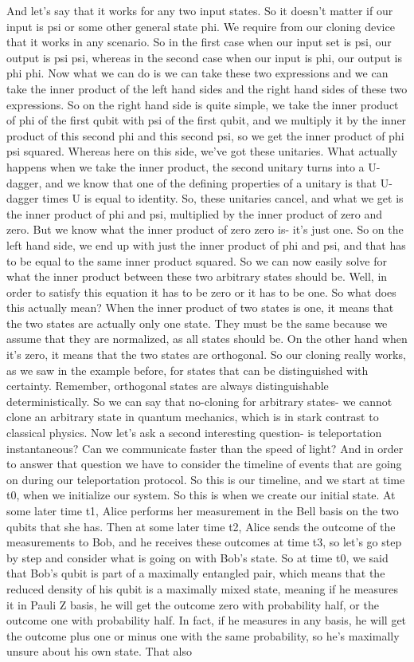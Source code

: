 And let's say that it works for any two input states. So it doesn't matter if our input is psi or some other general state phi. We require from our cloning device that it works in any scenario. So in the first case when our input set is psi, our output is psi psi, whereas in the second case when our input is phi, our output is phi phi. Now what we can do is we can take these two expressions and we can take the inner product of the left hand sides and the right hand sides of these two expressions. So on the right hand side is quite simple, we take the inner product of phi of the first qubit with psi of the first qubit, and we multiply it by the inner product of this second phi and this second psi, so we get the inner product of phi psi squared. Whereas here on this side, we've got these unitaries. What actually happens when we take the inner product, the second unitary turns into a U-dagger, and we know that one of the defining properties of a unitary is that U-dagger times U is equal to identity. So, these unitaries cancel, and what we get is the inner product of phi and psi, multiplied by the inner product of zero and zero. But we know what the inner product of zero zero is- it's just one. So on the left hand side, we end up with just the inner product of phi and psi, and that has to be equal to the same inner product squared. So we can now easily solve for what the inner product between these two arbitrary states should be. Well, in order to satisfy this equation it has to be zero or it has to be one. So what does this actually mean? When the inner product of two states is one, it means that the two states are actually only one state. They must be the same because we assume that they are normalized, as all states should be. On the other hand when it's zero, it means that the two states are orthogonal. So our cloning really works, as we saw in the example before, for states that can be distinguished with certainty. Remember, orthogonal states are always distinguishable deterministically. So we can say that no-cloning for arbitrary states- we cannot clone an arbitrary state in quantum mechanics, which is in stark contrast to classical physics. Now let's ask a second interesting question- is teleportation instantaneous? Can we communicate faster than the speed of light? And in order to answer that question we have to consider the timeline of events that are going on during our teleportation protocol. So this is our timeline, and we start at time t0, when we initialize our system. So this is when we create our initial state. At some later time t1, Alice performs her measurement in the Bell basis on the two qubits that she has. Then at some later time t2, Alice sends the outcome of the measurements to Bob, and he receives these outcomes at time t3, so let's go step by step and consider what is going on with Bob's state. So at time t0, we said that Bob's qubit is part of a maximally entangled pair, which means that the reduced density of his qubit is a maximally mixed state, meaning if he measures it in Pauli Z basis, he will get the outcome zero with probability half, or the outcome one with probability half. In fact, if he measures in any basis, he will get the outcome plus one or minus one with the same probability, so he's maximally unsure about his own state. That also 